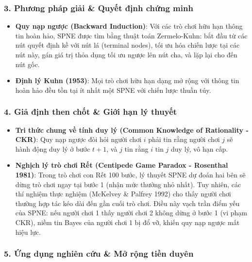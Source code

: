 \documentclass[
]{article}
\providecommand{\tightlist}{%
  \setlength{\itemsep}{0pt}\setlength{\parskip}{0pt}}
\begin{document}
\subsubsection{3. Phương pháp giải \& Quyết định chứng
minh}\label{phux1b0ux1a1ng-phuxe1p-giux1ea3i-quyux1ebft-ux111ux1ecbnh-chux1ee9ng-minh}

\begin{itemize}
\tightlist
\item
  \textbf{Quy nạp ngược (Backward Induction)}: Với các trò chơi hữu hạn
  thông tin hoàn hảo, SPNE được tìm bằng thuật toán Zermelo-Kuhn: bắt
  đầu từ các nút quyết định kề với nút lá (terminal nodes), tối ưu hóa
  chiến lược tại các nút này, gán giá trị thỏa dụng tối ưu ngược lên nút
  cha, và lặp lại cho đến nút gốc.
\item
  \textbf{Định lý Kuhn (1953)}: Mọi trò chơi hữu hạn dạng mở rộng với
  thông tin hoàn hảo đều tồn tại ít nhất một SPNE với chiến lược thuần
  túy.
\end{itemize}

\subsubsection{4. Giả định then chốt \& Giới hạn lý
thuyết}\label{giux1ea3-ux111ux1ecbnh-then-chux1ed1t-giux1edbi-hux1ea1n-luxfd-thuyux1ebft}

\begin{itemize}
\tightlist
\item
  \textbf{Tri thức chung về tính duy lý (Common Knowledge of Rationality
  - CKR)}: Quy nạp ngược đòi hỏi người chơi \(i\) phải tin rằng người
  chơi \(j\) sẽ hành động duy lý ở bước \(t+1\), và \(j\) tin rằng \(i\)
  tin \(j\) duy lý, vô hạn cấp.
\item
  \textbf{Nghịch lý trò chơi Rết (Centipede Game Paradox - Rosenthal
  1981)}: Trong trò chơi con Rết 100 bước, lý thuyết SPNE dự đoán hai
  bên sẽ dừng trò chơi ngay tại bước 1 (nhận mức thưởng nhỏ nhất). Tuy
  nhiên, các thí nghiệm thực nghiệm (McKelvey \& Palfrey 1992) cho thấy
  người chơi thường hợp tác kéo dài đến gần cuối trò chơi. Điều này vạch
  trần điểm yếu của SPNE: nếu người chơi 1 thấy người chơi 2 không dừng
  ở bước 1 (vi phạm CKR), niềm tin Bayes của người chơi 1 bị đổ vỡ,
  khiến quy nạp ngược mất hiệu lực.
\end{itemize}

\subsubsection{5. Ứng dụng nghiên cứu \& Mở rộng tiền
duyên}\label{ux1ee9ng-dux1ee5ng-nghiuxean-cux1ee9u-mux1edf-rux1ed9ng-tiux1ec1n-duyuxean}
\end{document}
